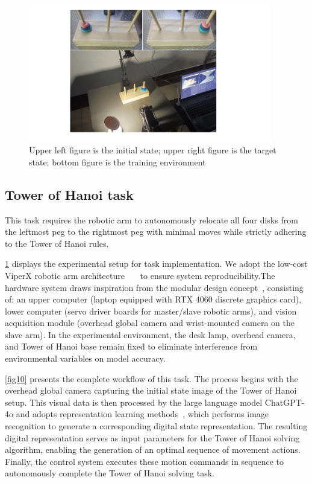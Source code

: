 \documentclass[runningheads]{llncs}
\begin{document}
\begin{figure}
  \includegraphics[width=0.95\textwidth]{fig4.pdf}
  \caption{Upper left figure is the initial state; upper right figure is the target state; bottom figure is the training environment} \label{fig2}
  \end{figure}

\subsection{Tower of Hanoi task}

This task requires the robotic arm to autonomously relocate all four disks from the leftmost peg to the rightmost peg with minimal moves while strictly adhering to the Tower of Hanoi rules.

\cref{fig2} displays the experimental setup for task implementation. We adopt the low-cost ViperX robotic arm architecture~\cite{ref1}~\cite{ref2}~\cite{ref3} to ensure system reproducibility.The hardware system draws inspiration from the modular design concept~\cite{ref4}, consisting of: an upper computer (laptop equipped with RTX 4060 discrete graphics card), lower computer (servo driver boards for master/slave robotic arms), and vision acquisition module (overhead global camera and wrist-mounted camera on the slave arm). In the experimental environment, the desk lamp, overhead camera, and Tower of Hanoi base remain fixed to eliminate interference from environmental variables on model accuracy.

\cref{fig10} presents the complete workflow of this task. The process begins with the overhead global camera capturing the initial state image of the Tower of Hanoi setup. This visual data is then processed by the large language model ChatGPT-4o and adopts representation learning methods~\cite{ref5}, which performs image recognition to generate a corresponding digital state representation. The resulting digital representation serves as input parameters for the Tower of Hanoi solving algorithm, enabling the generation of an optimal sequence of movement actions. Finally, the control system executes these motion commands in sequence to autonomously complete the Tower of Hanoi solving task.
\end{document}
